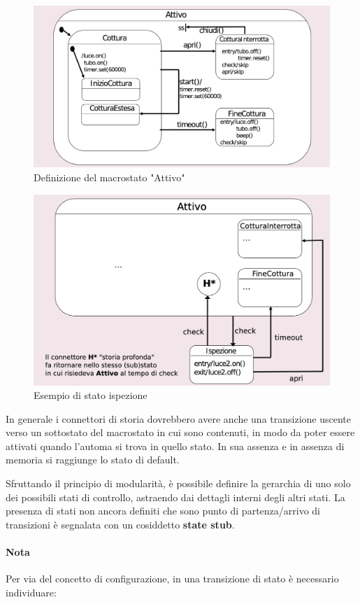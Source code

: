 \begin{figure}[H]
    \centering
    \includegraphics[width=0.75\linewidth]{assets/UML/state/state6.png}
    \caption{Definizione del macrostato "Attivo"}
\end{figure}

\begin{figure}[H]
    \centering
    \includegraphics[width=0.75\linewidth]{assets/UML/state/state7.png}
    \caption{Esempio di stato ispezione}
\end{figure}

In generale i connettori di storia dovrebbero avere anche una transizione uscente verso un sottostato del macrostato in cui sono contenuti, in modo da poter essere attivati quando l'automa si trova in quello stato. In sua assenza e in assenza di memoria si raggiunge lo stato di default.

Sfruttando il principio di modularità, è possibile definire la gerarchia di uno solo dei possibili stati di controllo, astraendo dai dettagli interni degli altri stati. La presenza di stati non ancora definiti che sono punto di partenza/arrivo di transizioni è segnalata con un cosiddetto \textbf{state stub}.

\paragraph{Nota} Per via del concetto di configurazione, in una transizione di stato è necessario individuare:

